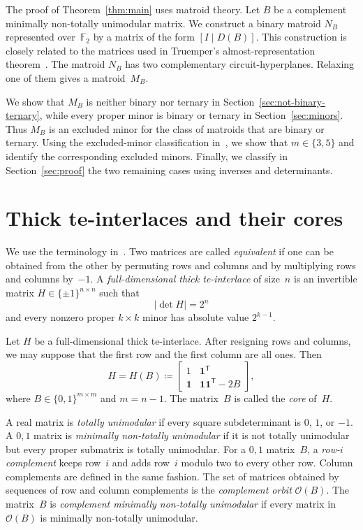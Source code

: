 \documentclass{amsart}
\numberwithin{equation}{section}
\newcommand{\F}{\mathbb F}
\newcommand{\one}{\mathbf 1}
\newcommand{\cO}{\mathcal O}
\newcommand{\sfT}{\mathsf T}
\begin{document}
The proof of Theorem~\ref{thm:main} uses matroid theory.
Let $B$ be a complement minimally non-totally unimodular matrix.
We construct a binary matroid $N_B$ represented over~$\F_2$ by a matrix of the form $[I\mid D(B)]$.
This construction is closely related to the matrices used in Truemper's almost-representation theorem~\cite[Construction~12.3.7]{Truemper1992book}.
The matroid $N_B$ has two complementary circuit-hyperplanes.
Relaxing one of them gives a matroid~$M_B$.

We show that $M_B$ is neither binary nor ternary in Section~\ref{sec:not-binary-ternary}, while every proper minor is binary or ternary in Section~\ref{sec:minors}.
Thus $M_B$ is an excluded minor for the class of matroids that are binary or ternary.
Using the excluded-minor classification in~\cite{Mayhew-Oporowski-Oxley-Whittle2011}, we show that $m\in \{3,5\}$ and identify the corresponding excluded minors.
Finally, we classify in Section~\ref{sec:proof} the two remaining cases using inverses and determinants.


\section{Thick te-interlaces and their cores} \label{sec:cores}

We use the terminology in~\cite{Chervet_Grappe_Vallee_2026}.
Two matrices are called \emph{equivalent} if one can be obtained from the other by permuting rows and columns and by multiplying rows and columns by~$-1$.
A \emph{full-dimensional thick te-interlace} of size~$n$ is an invertible matrix $H\in\{\pm1\}^{n\times n}$ such that
$$
    |\det H|=2^n
$$
and every nonzero proper $k\times k$ minor has absolute value $2^{k-1}$.

Let $H$ be a full-dimensional thick te-interlace.
After resigning rows and columns, we may suppose that the first row and the first column are all ones.
Then
\begin{equation}\label{eq:block-H}
    H=H(B) \coloneq 
        \begin{bmatrix}
            1 & \one^{\sfT} \\ 
            \one & \one\one^{\sfT}-2B
        \end{bmatrix},
\end{equation}
where $B\in\{0,1\}^{m\times m}$ and $m=n-1$.
The matrix~$B$ is called the \emph{core} of~$H$.

A real matrix is \emph{totally unimodular} if every square subdeterminant is $0$, $1$, or $-1$.
A $0,1$ matrix is \emph{minimally non-totally unimodular} if it is not totally unimodular but every proper submatrix is totally unimodular.
For a $0,1$ matrix~$B$, a \emph{row-$i$ complement} keeps row~$i$ and adds row~$i$ modulo two to every other row.
Column complements are defined in the same fashion.
The set of matrices obtained by sequences of row and column complements is the \emph{complement orbit} $\cO(B)$.
The matrix~$B$ is \emph{complement minimally non-totally unimodular} if every matrix in~$\cO(B)$ is minimally non-totally unimodular.
\end{document}
